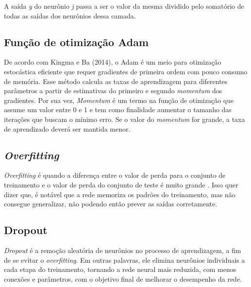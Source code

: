 A saída \textit{y} do neurônio \textit{j} passa a ser o valor da mesma dividido pelo somatório de todas as saídas dos neurônios dessa camada. 

\subsection{Função de otimização Adam}

De acordo com Kingma e Ba (2014)\nocite{kingma2014adam}, o Adam é um meio para otimização estocástica eficiente que requer gradientes de primeira ordem com pouco consumo de memória. Esse método calcula as taxas de aprendizagem para diferentes parâmetros a partir de estimativas do primeiro e segundo \textit{momentum} dos gradientes.
Por sua vez, \textit{Momentum} \cite{santos2018identificaccao} é um termo na função de otimização que assume um valor entre 0 e 1 e tem como finalidade aumentar o tamanho das iterações que buscam o mínimo erro. Se o valor do \textit{momentum} for grande, a taxa de aprendizado deverá ser mantida menor.

\subsection{\textit{Overfitting}}

\textit{Overfitting} é quando a diferença entre o valor de perda para o conjunto de treinamento e o valor de perda do conjunto de teste é muito grande \cite{santos2018identificaccao}. Isso quer dizer que, é notável que a rede memoriza os padrões do treinamento, mas não consegue generalizar, não podendo então prever as saídas corretamente.

\subsection{Dropout}

\textit{Dropout} é a remoção aleatória de neurônios no processo de aprendizagem, a fim de se evitar o \textit{overfitting}. Em outras palavras, ele elimina neurônios individuais a cada etapa do treinamento, tornando a rede neural mais reduzida, com menos conexões e parâmetros, com o objetivo final de melhorar o desempenho da rede.

